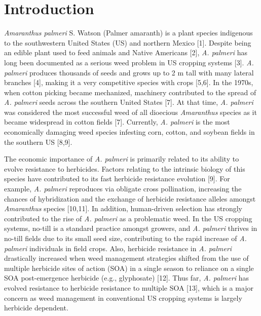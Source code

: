 \documentclass[10pt,letterpaper]{article}
\begin{document}
\hypertarget{introduction}{%
\section{Introduction}\label{introduction}}

\emph{Amaranthus palmeri} S. Watson (Palmer amaranth) is a plant species
indigenous to the southwestern United States (US) and northern Mexico
{[}1{]}. Despite being an edible plant used to feed animals and Native
Americans {[}2{]}, \emph{A. palmeri} has long been documented as a
serious weed problem in US cropping systems {[}3{]}. \emph{A. palmeri}
produces thousands of seeds and grows up to 2 m tall with many lateral
branches {[}4{]}, making it a very competitive species with crops
{[}5,6{]}. In the 1970s, when cotton picking became mechanized,
machinery contributed to the spread of \emph{A. palmeri} seeds across
the southern United States {[}7{]}. At that time, \emph{A. palmeri} was
considered the most successful weed of all dioecious \emph{Amaranthus}
species as it became widespread in cotton fields {[}7{]}. Currently,
\emph{A. palmeri} is the most economically damaging weed species
infesting corn, cotton, and soybean fields in the southern US {[}8,9{]}.

The economic importance of \emph{A. palmeri} is primarily related to its
ability to evolve resistance to herbicides. Factors relating to the
intrinsic biology of this species have contributed to its fast herbicide
resistance evolution {[}9{]}. For example, \emph{A. palmeri} reproduces
via obligate cross pollination, increasing the chances of hybridization
and the exchange of herbicide resistance alleles amongst
\emph{Amaranthus} species {[}10,11{]}. In addition, human-driven
selection has strongly contributed to the rise of \emph{A. palmeri} as a
problematic weed. In the US cropping systems, no-till is a standard
practice amongst growers, and \emph{A. palmeri} thrives in no-till
fields due to its small seed size, contributing to the rapid increase of
\emph{A. palmeri} individuals in field crops. Also, herbicide resistance
in \emph{A. palmeri} drastically increased when weed management
strategies shifted from the use of multiple herbicide sites of action
(SOA) in a single season to reliance on a single SOA post-emergence
herbicide (e.g., glyphosate) {[}12{]}. Thus far, \emph{A. palmeri} has
evolved resistance to herbicide resistance to multiple SOA {[}13{]},
which is a major concern as weed management in conventional US cropping
systems is largely herbicide dependent.
\end{document}
